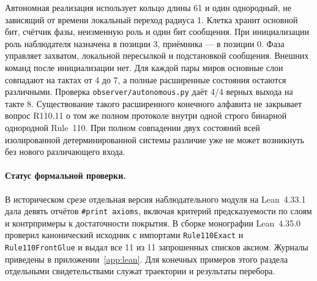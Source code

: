 Автономная реализация использует кольцо длины 61 и один однородный,
не зависящий от времени локальный переход радиуса 1. Клетка хранит основной
бит, счётчик фазы, неизменную роль и один бит сообщения. При инициализации
роль наблюдателя назначена в позиции 3, приёмника --- в позиции 0.
Фаза управляет захватом, локальной пересылкой и подстановкой сообщения.
Внешних команд после инициализации нет. Для каждой пары миров основные
слои совпадают на тактах от 4 до 7, а полные расширенные состояния остаются
различными. Проверка \nolinkurl{observer/autonomous.py} даёт 4/4 верных
выхода на такте 8. Существование такого расширенного конечного алфавита
не закрывает вопрос R110.11 о том же полном протоколе внутри одной строго
бинарной однородной Rule~110. При полном совпадении двух состояний всей
изолированной детерминированной системы различие уже не может возникнуть
без нового различающего входа.

\paragraph{Статус формальной проверки.}
В историческом срезе отдельная версия наблюдательного модуля на Lean~4.33.1
дала девять отчётов \texttt{\#print axioms}, включая критерий предсказуемости
по слоям и контрпримеры к достаточности покрытия. В сборке монографии Lean~4.35.0 проверил канонический
исходник с импортами \texttt{Rule110Exact} и \texttt{Rule110FrontGlue}
и выдал все 11 из 11 запрошенных списков аксиом. Журналы приведены в
приложении~\ref{app:lean}. Для конечных примеров этого раздела отдельными
свидетельствами служат траектории и результаты перебора.
